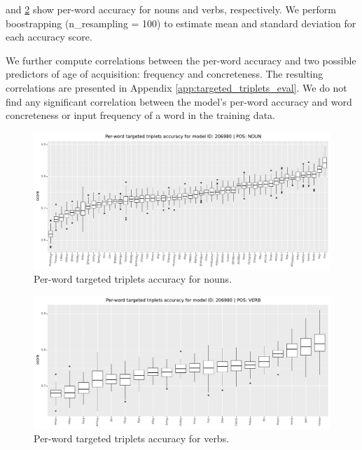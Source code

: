  and
\ref{fig:accuracy_targeted_triplets_verbs} show per-word
accuracy for nouns and verbs, respectively. We perform boostrapping (n\_resampling = 100) to estimate mean and standard deviation for each accuracy score.

We further compute correlations between the per-word accuracy and two possible predictors of age of acquisition: frequency and concreteness. The resulting correlations are presented in Appendix \ref{app:targeted_triplets_eval}. We do not find any significant correlation between the model's per-word accuracy and word concreteness or input frequency of a word in the training data.




\begin{figure}[htb]
  \centering
  \includegraphics[width=\textwidth]{results/targeted_triplets/results_per_word_version_206980_NOUN.pdf}
  \caption{Per-word targeted triplets accuracy for nouns.}
  \label{fig:accuracy_targeted_triplets_nouns}
\end{figure}

\begin{figure}[htb]
  \centering
  \includegraphics[width=\textwidth]{results/targeted_triplets/results_per_word_version_206980_VERB.pdf}
  \caption{Per-word targeted triplets accuracy for verbs.}
  \label{fig:accuracy_targeted_triplets_verbs}
\end{figure}
